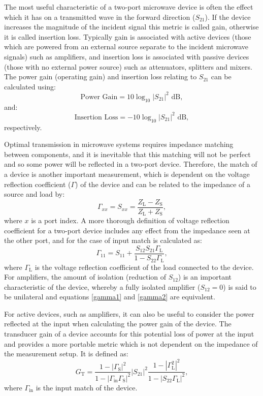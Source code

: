 \documentclass[../thesis/thesis.tex]{subfiles}
\begin{document}
\begin{refsection}
The most useful characteristic of a two-port microwave device is often the effect which it has on a transmitted wave in the forward direction ($S_{21}$). If the device increases the magnitude of the incident signal this metric is called gain, otherwise it is called insertion loss. Typically gain is associated with active devices (those which are powered from an external source separate to the incident microwave signals) such as amplifiers, and insertion loss is associated with passive devices (those with no external power source) such as attenuators, splitters and mixers. The power gain (operating gain) and insertion loss relating to $S_{21}$ can be calculated using:
\begin{equation}
\textrm{Power Gain} = 10 \log_{10} |S_{21}|^2 \textrm{ dB},
\end{equation}
and:
\begin{equation}
\textrm{Insertion Loss} = -10 \log_{10} |S_{21}|^2 \textrm{ dB},
\end{equation}
respectively.

Optimal transmission in microwave systems requires impedance matching between components, and it is inevitable that this matching will not be perfect and so some power will be reflected in a two-port device. Therefore, the match of a device is another important measurement, which is dependent on the voltage reflection coefficient ($\Gamma$) of the device and can be related to the impedance of a source and load by:
\begin{equation}
\Gamma_{xx} = S_{xx} = \dfrac{Z_\textrm{L}-Z_\textrm{S}}{Z_\textrm{L}+Z_\textrm{S}},
\label{gamma1}
\end{equation}
where $x$ is a port index.
A more thorough definition of voltage reflection coefficient for a two-port device includes any effect from the impedance seen at the other port, and for the case of input match is calculated as:
\begin{equation}
\Gamma_{11} = S_{11} + \dfrac{S_{12}S_{21}\Gamma_\textrm{L}}
{1-S_{22}\Gamma_\textrm{L}},
\label{gamma2}
\end{equation}
where $\Gamma_\textrm{L}$ is the voltage reflection coefficient of the load connected to the device. For amplifiers, the amount of isolation (reduction of $S_{12}$) is an important characteristic of the device, whereby a fully isolated amplifier ($S_{12}=0$) is said to be unilateral and equations \ref{gamma1} and \ref{gamma2} are equivalent.

For active devices, such as amplifiers, it can also be useful to consider the power reflected at the input when calculating the power gain of the device. The transducer gain of a device accounts for this potential loss of power at the input and provides a more portable metric which is not dependent on the impedance of the measurement setup. It is defined as:
\begin{equation}
G_\textrm{T} = \dfrac{1-|\Gamma_\textrm{S}|^2}
{1-|\Gamma_\textrm{in}\Gamma_\textrm{S}|^2}
|S_{21}|^2
\dfrac{1-|\Gamma_\textrm{L}^2|^2}
{1-|S_{22}\Gamma_\textrm{L}|^2},
\end{equation}
where $\Gamma_\textrm{in}$ is the input match of the device.


\end{refsection}
\end{document}
